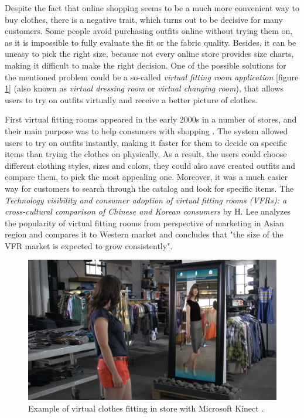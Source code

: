 \documentclass[a4paper]{report}
\begin{document}
Despite the fact that online shopping seems to be a much more convenient way to buy clothes, there is a negative trait, which turns out to be decisive for many customers. Some people avoid purchasing outfits online without trying them on, as it is impossible to fully evaluate the fit or the fabric quality. Besides, it can be uneasy to pick the right size, because not every online store provides size charts, making it difficult to make the right decision. 
One of the possible solutions for the mentioned problem could be a so-called \textit{virtual fitting room application} [figure \ref{fig:virtual_fitting_example}] (also known as  \textit{virtual dressing room} or  \textit{virtual changing room}), that allows users to try on outfits virtually and receive a better picture of clothes. 

\bigskip First virtual fitting rooms appeared in the early 2000s in a number of stores, and their main purpose was to help consumers with shopping \cite{VFR_management}. The system allowed users to try on outfits instantly, making it faster for them to decide on specific items than trying the clothes on physically. As a result, the users could choose different clothing styles, sizes and colors, they could also save created outfits and compare them, to pick the most appealing one. Moreover, it was a much easier way for customers to search through the catalog and look for specific items. The \textit{Technology visibility and consumer adoption of virtual fitting rooms (VFRs): a cross-cultural comparison of Chinese and Korean consumers} by H. Lee \cite{VFR_marketing_china_korea} analyzes the popularity of virtual fitting rooms from perspective of marketing in Asian region and compares it to Western market and concludes that "the size of the VFR market is expected to grow consistently".




\begin{figure}[H]
\centering
  \includegraphics[width = \textwidth, keepaspectratio]{images/VFR/VFR_example_2D_2(1).png}
  \caption{Example of virtual clothes fitting in store with Microsoft Kinect \cite{kinectStoreDemo}.}
  \label{fig:virtual_fitting_example}
\end{figure}
\end{document}
